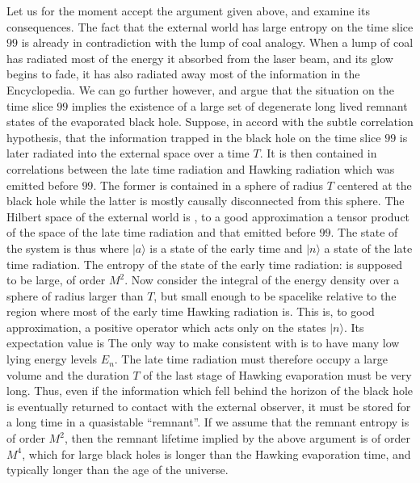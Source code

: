 
Let us for the moment accept the argument given above, and examine its
consequences.
The fact that the external world has large entropy on the time slice
$99$
is already
in contradiction with the lump of coal analogy.  When a lump of coal has
radiated most of the energy it absorbed from the laser beam, and its glow
begins to fade, it has also radiated away most of the information in the
Encyclopedia.
We can go further however, and argue that the situation on the time slice $99$
implies the existence of a large set of degenerate long lived remnant states of
the evaporated black hole.  Suppose, in accord with the subtle correlation
hypothesis,
that the information trapped in the black hole on the time slice $99$
is later radiated into the external space
over a time $T$.  It is then contained in correlations between the late time
radiation and Hawking radiation which was emitted before $99$.  The
former is
contained
in a sphere of radius $T$ centered at the black hole while the latter is mostly causally disconnected from this
 sphere.  The Hilbert space of the external world is , to a good approximation
a tensor product of the space of the late time radiation and that
emitted
before $99$.
The state of the system is thus
\eqn{}
where $\vert a\rangle$ is a state of the early time and $\vert n\rangle$ a state of
the
late
time radiation.
The entropy of the state of the early time radiation:
\eqn{}
is supposed to be large, of order $M^2$.
Now consider the integral of the energy density over a sphere of radius larger
than $T$, but small enough to be spacelike relative to the region where most
of the early time Hawking radiation is.  This is, to good approximation,
a
positive
operator which acts only on the states $\vert n \rangle$.  Its expectation value is
\eqn{}
The only way to make \energy consistent with \entropy is to have many low
lying
energy levels $E_n$.  The late time radiation must therefore
occupy a large volume and the duration $T$ of the last stage of Hawking
evaporation
must be very long.
Thus, even if the information which fell behind the horizon of the black
hole
is
eventually returned to contact with the external observer, it must be stored
for a long time in a quasistable ``remnant''.   If we assume that the remnant
entropy is of order $M^2$, then the remnant lifetime implied by
the above argument is of order $M^4$, which for large black holes is
longer than the Hawking evaporation time, and typically longer than
the age of the universe.

